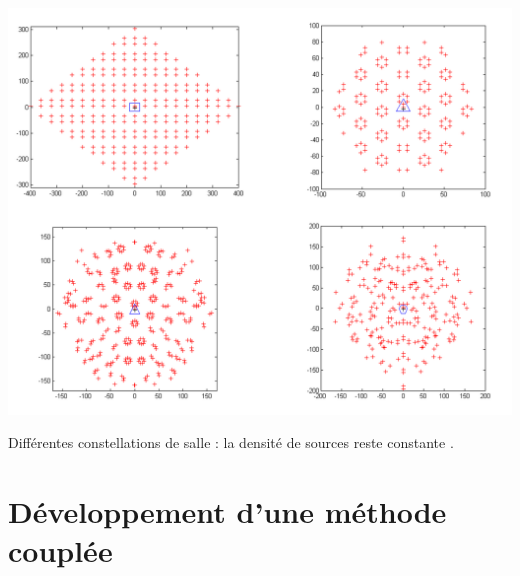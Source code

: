 \begin{figureth}
	\includegraphics[width=\linewidth]{images/constellations}
	\caption[Différentes constellations de salle : la densité de sources reste constante.]{Différentes constellations de salle : la densité de sources reste constante \footnotemark.}
	\label{constellations}
\end{figureth}


		
		
		
		
		
		
		
		
		
		
		
		
		
\chapter{Développement d'une méthode couplée}
	\minitoc
	\newpage
	
